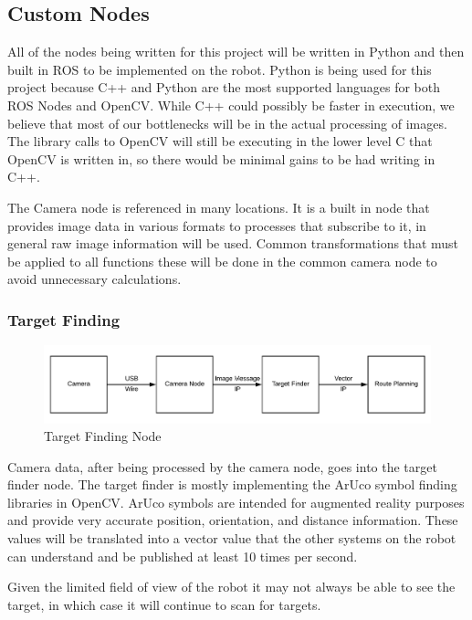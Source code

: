 \documentclass{article}
\begin{document}
	\subsection{Custom Nodes}
	
	 All of the nodes being written for this project will be written in Python and then built in ROS to be implemented on the robot. Python is being used for this project because C++ and Python are the most supported languages for both ROS Nodes and OpenCV. While C++ could possibly be faster in execution, we believe that most of our bottlenecks will be in the actual processing of images. The library calls to OpenCV will still be executing in the lower level C that OpenCV is written in, so there would be minimal gains to be had writing in C++.
	 
	 The Camera node is referenced in many locations. It is a built in node that provides image data in various formats to processes that subscribe to it, in general raw image information will be used. Common transformations that must be applied to all functions these will be done in the common camera node to avoid unnecessary calculations.
	
	\subsubsection{Target Finding}
	
	\begin{figure}[H]
		\centering
		\includegraphics[width=0.9\linewidth]{Camera-Target-Route}
		\caption{Target Finding Node}
		\label{fig:target}
	\end{figure}

	Camera data, after being processed by the camera node, goes into the target finder node. The target finder is mostly implementing the ArUco symbol finding libraries in OpenCV. ArUco symbols are intended for augmented reality purposes and provide very accurate position, orientation, and distance information. These values will be translated into a vector value that the other systems on the robot can understand and be published at least 10 times per second.
	
	Given the limited field of view of the robot it may not always be able to see the target, in which case it will continue to scan for targets.
	
\end{document}
